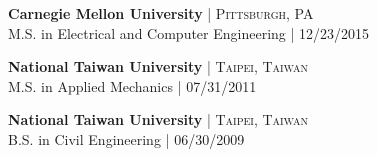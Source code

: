 
\textbf{Carnegie Mellon University} {\hfill\footnotesize\textsc{| Pittsburgh, PA}}\\
M.S. in Electrical and Computer Engineering {\hfill\footnotesize\textsc{| 12/23/2015}}

\textbf{National Taiwan University} {\hfill\footnotesize\textsc{| Taipei, Taiwan}}\\
M.S. in Applied Mechanics {\hfill\footnotesize\textsc{| 07/31/2011}}

\textbf{National Taiwan University} {\hfill\footnotesize\textsc{| Taipei, Taiwan}}\\
B.S. in Civil Engineering {\hfill\footnotesize\textsc{| 06/30/2009}}
